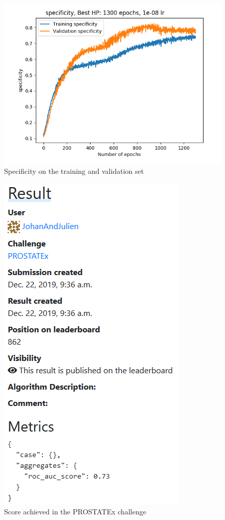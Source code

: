 \begin{figure}[!h]
\centering
\includegraphics[height=0.4\textheight, keepaspectratio=true]{./figures/paper_reproduction_results_part3.png}
\caption{Specificity on the training and validation set}
\label{fig:paper_reprodution_results_part_3}
\end{figure}

\begin{figure}[!h]
\centering
\includegraphics[height=0.4\textheight, keepaspectratio=true]{./figures/paper_reproduction_results_challenge.png}
\caption{Score achieved in the PROSTATEx challenge}
\label{fig:paper_reprodution_results_challenge}
\end{figure}

